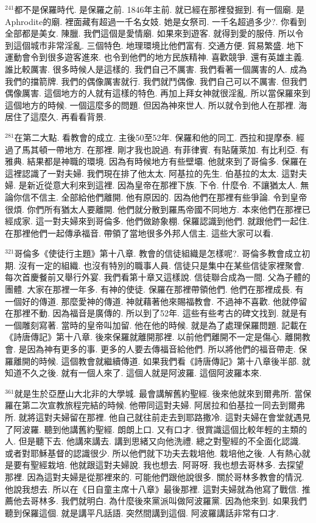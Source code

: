 \documentclass{book}
\begin{document}
$^{241}$都不是保羅時代.
是保羅之前.
1846年主前.
就已經在那裡發掘到.
有一個廟.
是Aphrodite的廟.
裡面藏有超過一千名女妓.
她是女祭司.
一千名超過多少?.
你看到全部都是美女.
陳臘.
我們這個是愛情廟.
如果來到遊客.
就得到愛的服侍.
所以令到這個城市非常淫亂.
三個特色.
地理環境比他們富有.
交通方便.
貿易繁盛.
地下運動會令到很多遊客進來.
也令到他們的地方民族精神.
喜歡競爭.
還有英雄主義.
誰比較厲害.
很多時候人是這樣的.
我們自己不厲害.
我們看著一個厲害的人.
成為我們的擋箭牌.
我們的偶像厲害就行.
我們就鬥偶像.
我們自己可以不厲害.
但我們偶像厲害.
這個地方的人就有這樣的特色.
再加上拜女神就很淫亂.
所以當保羅來到這個地方的時候.
一個這麼多的問題.
但因為神來世人.
所以就令到他人在那裡.
海居住了這麼久.
再看看背景.

$^{281}$在第二大點.
看教會的成立.
主後50至52年.
保羅和他的同工.
西拉和提摩泰.
經過了馬其頓一帶地方.
在那裡.
剛才我也說過.
有菲律賓.
有貼薩萊加.
有比利亞.
有雅典.
結果都是神職的環境.
因為有時候地方有些壁壩.
他就來到了哥倫多.
保羅在這裡認識了一對夫婦.
我們現在排了他太太.
阿基拉的先生.
伯基拉的太太.
這對夫婦.
是新近從意大利來到這裡.
因為皇帝在那裡下族.
下令.
什麼令.
不讓猶太人.
無論你信不信主.
全部給他們離開.
他有原因的.
因為他們在那裡有些爭論.
令到皇帝很煩.
你們所有猶太人要離開.
他們就分散到羅馬帝國不同地方.
本來他們在那裡已經成家.
這一對夫婦來到哥倫多.
他們做跡象棚.
保羅認識到他們.
就跟他們一起住.
在那裡他們一起傳承福音.
帶領了當地很多外邦人信主.
這些大家可以看.

$^{321}$哥倫多《使徒行主題》第十八章.
教會的信徒組織是怎樣呢?.
哥倫多教會成立初期.
沒有一定的組織.
也沒有特別的職事人員.
信徒只是集中在某些信徒家裡聚會.
每次首慶餐前又舉行外宴.
我們看第十章又這樣說.
信徒聯合成為一間.
父為子體的團體.
大家在那裡一年多.
有神的使徒.
保羅在那裡帶領他們.
他們在那裡成長.
有一個好的傳道.
那麼愛神的傳道.
神就藉著他來賜福教會.
不過神不喜歡.
他就停留在那裡不動.
因為福音是廣傳的.
所以到了52年.
這些有些考古的碑文找到.
就是有一個雕刻寫著.
當時的皇帝叫加留.
他在他的時候.
就是為了處理保羅問題.
記載在《詩唐傳記》第十八章.
後來保羅就離開那裡.
以前他們離開不一定是傷心.
離開教會.
是因為神有更多的事.
更多的人要去傳福音給他們.
所以將他們的福音帶走.
保羅離開的時候.
這個教會就繼續傳道.
如果我們看《詩唐傳記》第十八章後半部.
就知道不久之後.
就有一個人來了.
這個人就是阿波羅.
這個阿波羅本來.

$^{361}$就是生於亞歷山大北非的大學城.
最會講解舊約聖經.
後來他就來到爾弗所.
當保羅在第二次宣教旅程完結的時候.
他帶同這對夫婦.
阿居拉和伯基拉一同去到爾弗所.
就將這對夫婦留在那裡.
他自己就往前走去到耶路撒冷.
這對夫婦在會堂就遇見了阿波羅.
聽到他講舊約聖經.
朗朗上口.
又有口才.
很賞識這個比較年輕的主類的人.
但是聽下去.
他講來講去.
講到思緒又向他洗禮.
總之對聖經的不全面化認識.
或者對耶穌基督的認識很少.
所以他們就下功夫去栽培他.
栽培他之後.
人有熱心就是要有聖經栽培.
他就跟這對夫婦說.
我也想去.
阿哥呀.
我也想去哥林多.
去探望那裡.
因為這對夫婦是從那裡來的.
可能他們跟他說很多.
關於哥林多教會的情況.
他說我想去.
所以在《日自童主席十八章》最後那裡.
這對夫婦就為他寫了戰信.
推薦他去哥林多.
我們就明白.
為什麼後來黨派叫做阿波羅黨.
因為他來到.
如果我們聽到保羅這個.
就是講平凡話語.
突然間講到這個.
阿波羅講話非常有口才.
\end{document}
